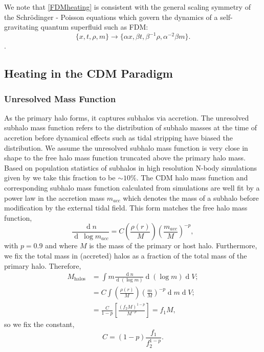 \documentclass[usenatbib]{mnras}
\renewcommand{\d}[1]{\! \mathrm{d}#1 \:}
\newcommand{\deriv}[2]{\frac{\d{#1}}{\d{#2}}}
\renewcommand{\d}[1]{\ensuremath{\operatorname{d}\!{#1}}}
\begin{document}
\par
We note that \eqref{FDMheating} is consistent with the general scaling symmetry of the Schr\"{o}dinger - Poisson equations which govern the dynamics of a self-gravitating quantum superfluid such as FDM:
\begin{equation}
\{ x, t , \rho, m \} \to \{\alpha x, \beta t, \beta^{-1} \rho, \alpha^{-2} \beta m \} .
\end{equation}
\noindent \citep{Schrodinger-Poisson}.
\subsection{Heating in the CDM Paradigm}

\subsubsection{Unresolved Mass Function}

As the primary halo forms, it captures subhalos via accretion. The unresolved subhalo mass function refers to the distribution of subhalo masses at the time of accretion before dynamical effects such as tidal stripping have biased the distribution. We assume the unresolved subhalo mass function is very close in shape to the free halo mass function truncated above the primary halo mass. Based on population statistics of subhalos in high resolution N-body simulations given by \citet{subhalo_abundance} we take this fraction to be $\sim 10\%$. The CDM halo mass function and corresponding subhalo mass function calculated from simulations \citep{pop_of_subhalos, unified_model} are well fit by a power law in the accretion mass $m_{acc}$ which denotes the mass of a subhalo before modification by the external tidal field. This form matches the free halo mass function, 
\begin{equation}
\frac{\d{n}}{\d{\: \log{m_{acc}}}} = C \left(\frac{\rho(r)}{M}\right) \left(\frac{m_{acc}}{M} \right)^{-p} ,
\end{equation}
with $p = 0.9$ and where $M$ is the mass of the primary or host halo.
Furthermore, we fix the total mass in (accreted) halos as a fraction of the total mass of the primary halo. Therefore,
\begin{subequations}
\begin{align}
M_{\mathrm{halos}} & = \int m \deriv{n}{(\log{m})} \d{(\log{m})} \d{V} ;
\\
& = C \int \left(\frac{\rho(r)}{M}\right) \left(\frac{m}{M} \right)^{-p} \d{m} \d{V} ;
\\
& = \frac{C}{1-p} \left[ \frac{(f_2 M)^{1-p}}{M^{-p}} \right] = f_1 M ,
\end{align} 
\end{subequations}
so we fix the constant,
\begin{equation}
C = (1 - p)\frac{f_1}{f_2^{1-p}} .
\end{equation}
\end{document}
